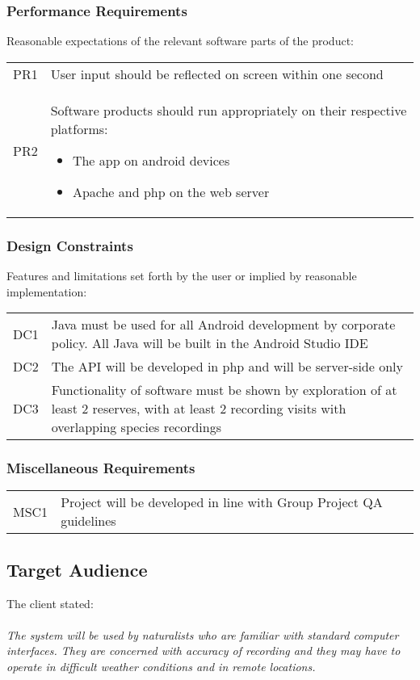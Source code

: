\subsubsection{Performance Requirements}
	Reasonable expectations of the relevant software parts of the product: \\
	\begin{tabular}{r | p{15cm}}
		PR1 & User input should be reflected on screen within one second \\
		PR2 & Software products should run appropriately on their respective platforms:
		\begin{itemize}
			\item The app on android devices
			\item Apache and php on the web server
		\end{itemize}
	\end{tabular}

\subsubsection{Design Constraints}
	Features and limitations set forth by the user or implied by reasonable implementation: \\
	\begin{tabular}{r | p{15cm}}
		DC1 & Java must be used for all Android development by corporate policy. All Java will be built in the Android Studio IDE \\
		DC2 & The API will be developed in php and will be server-side only \\
		DC3 & Functionality of software must be shown by exploration of at least 2 reserves, with at least 2 recording visits with overlapping species recordings \\
	\end{tabular}

\subsubsection{Miscellaneous Requirements}
	\begin{tabular}{r | p{15cm}}
		MSC1 & Project will be developed in line with Group Project QA guidelines \\
	\end{tabular}

\subsection{Target Audience}
	The client stated: \\ \\
		\indent \textit{The system will be used by naturalists who are familiar with standard computer interfaces. They are concerned with accuracy of recording and they may have to operate in difficult weather conditions and in remote locations.}\\ \\

